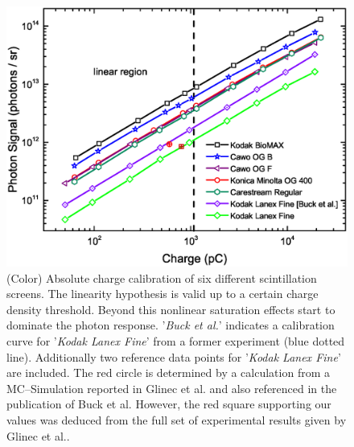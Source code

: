 \documentclass[%
preprint,
amsmath,
amssymb,
aip,
rsi, 
numerical,
floatfix,
]{revtex4-1}
\begin{document}
\begin{figure}
\includegraphics[width=\textwidth]{./Figures/Absolute}%
\caption{\label{fig:Calib}(Color) Absolute charge calibration of six different scintillation screens.
The linearity hypothesis is valid up to a certain charge density threshold. Beyond this nonlinear saturation effects start to dominate the photon response.
'\textit{Buck et al.}' indicates a calibration curve for '\textit{Kodak Lanex Fine}' from a former experiment \cite{Buck2010} (blue dotted line).
Additionally two reference data points for '\textit{Kodak Lanex Fine}' are included. 
The red circle is determined by a calculation from a MC--Simulation reported in Glinec et al. \cite{Glinec2006} and also referenced in the publication of Buck et al. 
However, the red square supporting our values was deduced from the full set of experimental results given by Glinec et al.. }
\end{figure}
\end{document}
